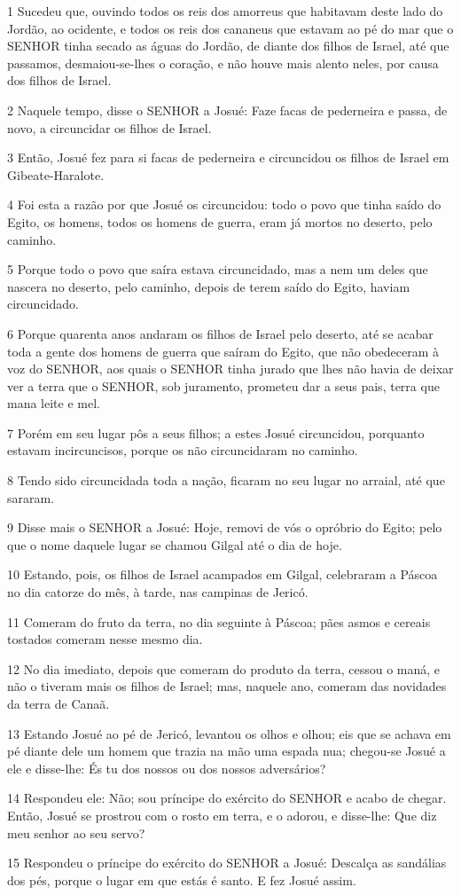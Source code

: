 \par 1 Sucedeu que, ouvindo todos os reis dos amorreus que habitavam deste lado do Jordão, ao ocidente, e todos os reis dos cananeus que estavam ao pé do mar que o SENHOR tinha secado as águas do Jordão, de diante dos filhos de Israel, até que passamos, desmaiou-se-lhes o coração, e não houve mais alento neles, por causa dos filhos de Israel.
\par 2 Naquele tempo, disse o SENHOR a Josué: Faze facas de pederneira e passa, de novo, a circuncidar os filhos de Israel.
\par 3 Então, Josué fez para si facas de pederneira e circuncidou os filhos de Israel em Gibeate-Haralote.
\par 4 Foi esta a razão por que Josué os circuncidou: todo o povo que tinha saído do Egito, os homens, todos os homens de guerra, eram já mortos no deserto, pelo caminho.
\par 5 Porque todo o povo que saíra estava circuncidado, mas a nem um deles que nascera no deserto, pelo caminho, depois de terem saído do Egito, haviam circuncidado.
\par 6 Porque quarenta anos andaram os filhos de Israel pelo deserto, até se acabar toda a gente dos homens de guerra que saíram do Egito, que não obedeceram à voz do SENHOR, aos quais o SENHOR tinha jurado que lhes não havia de deixar ver a terra que o SENHOR, sob juramento, prometeu dar a seus pais, terra que mana leite e mel.
\par 7 Porém em seu lugar pôs a seus filhos; a estes Josué circuncidou, porquanto estavam incircuncisos, porque os não circuncidaram no caminho.
\par 8 Tendo sido circuncidada toda a nação, ficaram no seu lugar no arraial, até que sararam.
\par 9 Disse mais o SENHOR a Josué: Hoje, removi de vós o opróbrio do Egito; pelo que o nome daquele lugar se chamou Gilgal até o dia de hoje.
\par 10 Estando, pois, os filhos de Israel acampados em Gilgal, celebraram a Páscoa no dia catorze do mês, à tarde, nas campinas de Jericó.
\par 11 Comeram do fruto da terra, no dia seguinte à Páscoa; pães asmos e cereais tostados comeram nesse mesmo dia.
\par 12 No dia imediato, depois que comeram do produto da terra, cessou o maná, e não o tiveram mais os filhos de Israel; mas, naquele ano, comeram das novidades da terra de Canaã.
\par 13 Estando Josué ao pé de Jericó, levantou os olhos e olhou; eis que se achava em pé diante dele um homem que trazia na mão uma espada nua; chegou-se Josué a ele e disse-lhe: És tu dos nossos ou dos nossos adversários?
\par 14 Respondeu ele: Não; sou príncipe do exército do SENHOR e acabo de chegar. Então, Josué se prostrou com o rosto em terra, e o adorou, e disse-lhe: Que diz meu senhor ao seu servo?
\par 15 Respondeu o príncipe do exército do SENHOR a Josué: Descalça as sandálias dos pés, porque o lugar em que estás é santo. E fez Josué assim.

